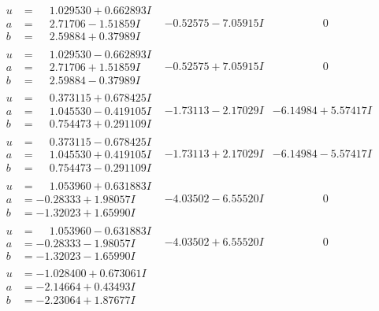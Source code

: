 \documentclass[1p]{elsarticle_modified}
\theoremstyle{definition}
\begin{document}
$$\begin{array}{c|c|c}
\begin{aligned}
u &= \phantom{-}1.029530 + 0.662893 I \\
a &= \phantom{-}2.71706 - 1.51859 I \\
b &= \phantom{-}2.59884 + 0.37989 I\end{aligned}
 & -0.52575 - 7.05915 I & \phantom{-0.000000 } 0 \\ \hline\begin{aligned}
u &= \phantom{-}1.029530 - 0.662893 I \\
a &= \phantom{-}2.71706 + 1.51859 I \\
b &= \phantom{-}2.59884 - 0.37989 I\end{aligned}
 & -0.52575 + 7.05915 I & \phantom{-0.000000 } 0 \\ \hline\begin{aligned}
u &= \phantom{-}0.373115 + 0.678425 I \\
a &= \phantom{-}1.045530 - 0.419105 I \\
b &= \phantom{-}0.754473 + 0.291109 I\end{aligned}
 & -1.73113 - 2.17029 I & -6.14984 + 5.57417 I \\ \hline\begin{aligned}
u &= \phantom{-}0.373115 - 0.678425 I \\
a &= \phantom{-}1.045530 + 0.419105 I \\
b &= \phantom{-}0.754473 - 0.291109 I\end{aligned}
 & -1.73113 + 2.17029 I & -6.14984 - 5.57417 I \\ \hline\begin{aligned}
u &= \phantom{-}1.053960 + 0.631883 I \\
a &= -0.28333 + 1.98057 I \\
b &= -1.32023 + 1.65990 I\end{aligned}
 & -4.03502 - 6.55520 I & \phantom{-0.000000 } 0 \\ \hline\begin{aligned}
u &= \phantom{-}1.053960 - 0.631883 I \\
a &= -0.28333 - 1.98057 I \\
b &= -1.32023 - 1.65990 I\end{aligned}
 & -4.03502 + 6.55520 I & \phantom{-0.000000 } 0 \\ \hline\begin{aligned}
u &= -1.028400 + 0.673061 I \\
a &= -2.14664 + 0.43493 I \\
b &= -2.23064 + 1.87677 I\end{aligned}

\end{array}$$
\end{document}
